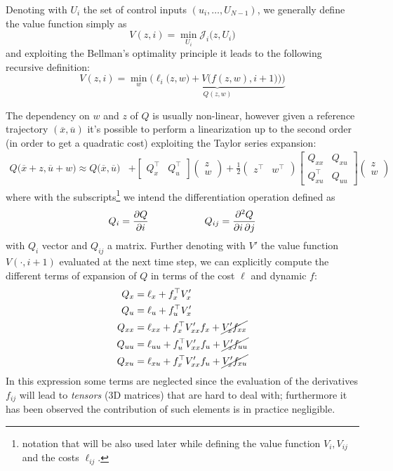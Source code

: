 	Denoting with $U_i$ the set of control inputs $(u_i,\dots, U_{N-1})$, we generally define the value function simply as
	\[ V(z,i) = \min_{U_i} \mathcal J_i\big(z, U_i\big) \]
	and exploiting the Bellman's optimality principle it leads to the following recursive definition:
	\[ V(z,i) = \min_w \underbrace{\Big(\ell_i \big(z, w) + V\big(f(z,w), i+1\big)\big)\Big)}_{Q(z,w)} \]
	
	The dependency on $w$ and $z$ of $Q$ is usually non-linear, however given a reference trajectory $(\overline x,\overline u)$ it's possible to perform a linearization up to the second order (in order to get a quadratic cost) exploiting the Taylor series expansion:
	\begin{equation} \label{eq:DDPlinearized}
	\begin{aligned}
		Q\big(\overline x + z, \overline u + w\big) \approx Q\big(\overline x, \overline u\big) & + \begin{bmatrix}
			Q_x^\top & Q_u^\top
		\end{bmatrix} \begin{pmatrix}
			z \\ w
		\end{pmatrix} + \frac 1 2 \begin{pmatrix}
			z^\top & w^\top
		\end{pmatrix} \begin{bmatrix}
			Q_{xx} & Q_{xu} \\ Q_{xu}^\top & Q_{uu}
		\end{bmatrix} \begin{pmatrix}
			z \\ w
		\end{pmatrix}
	\end{aligned}
	\end{equation}
	where with the subscripts\footnote{notation that will be also used later while defining the value function $V_i, V_{ij}$ and the costs $\ell_{ij}$.} we intend the differentiation operation defined as
	\[ Q_i = \frac{\partial Q}{\partial i} \hspace{2cm} Q_{ij} = \frac{\partial ^2Q}{\partial i \,\partial j} \]
	with $Q_i$ vector and $Q_{ij}$ a matrix. Further denoting with $V'$ the value function $V(\cdot, i+1)$ evaluated at the next time step, we can explicitly compute the different terms of expansion of $Q$ in terms of the cost $\ell$ and dynamic $f$:
	\begin{equation} \label{eq:temp:6}
	\begin{aligned}
		Q_x & = \ell_x + f_x^\top V_x' \\
		Q_u & = \ell_u + f_u^\top V_x' \\
		Q_{xx} & = \ell_{xx} + f_x^\top V_{xx}' f_x + \cancel{V_x' f_{xx}} \\
		Q_{uu} & = \ell_{uu} + f_u^\top V_{xx}' f_u + \cancel{V_x' f_{uu}} \\
		Q_{xu} & = \ell_{xu} + f_x^\top V_{xx}' f_u + \cancel{V_x' f_{xu}} 
	\end{aligned}
	\end{equation}
	In this expression some terms are neglected since the evaluation of the derivatives $f_{ij}$ will lead to \textit{tensors} (3D matrices) that are hard to deal with; furthermore it has been observed the contribution of such elements is in practice negligible.
	
